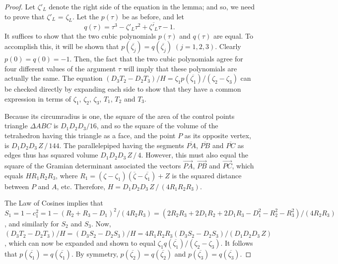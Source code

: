\documentclass[a4paper, twoside]{article}
\begin{document}
\vspace{2mm} 

\begin{proof}
Let $\zeta'_L$ denote the right side of the equation in the lemma; and so, we need to prove that $\zeta'_L$ = $\zeta_L$.
Let the $p(\tau)$ be as before, and let 
$$q(\tau) = \tau^3 - \zeta'_L \tau^2 + \overline{\zeta'_L} \tau - 1.$$ 
It suffices to show that the two cubic polynomials $p(\tau)$ and $q(\tau)$ are equal. To accomplish this, it will be shown that $p(\overline{\zeta_j}) = q(\overline{\zeta_j}) \; (j=1,2,3)$. Clearly $p(0) = q(0) = -1$. Then, the fact that the two cubic polynomials agree for four different values of the argument $\tau$ will imply that these polynomials are actually the same. The equation $(D_3 T_2 - D_2 T_3) / H = \zeta_1 p(\overline{\zeta_1}) / (\zeta_2-\zeta_3)$ can be checked directly by expanding each side to show that they have a common expression in terms of $\zeta_1$, $\zeta_2$, $\zeta_3$, $T_1$, $T_2$ and $T_3$. 

Because its circumradius is one, the square of the area of the control points triangle $\Delta ABC$ is $D_1 D_2 D_3 / 16$, and so the square of the volume of the tetrahedron having this triangle as a face, and the point $P$ as its opposite vertex, is $D_1 D_2 D_3 \, Z \, / \, 144$. The parallelepiped having the segments $\overline{PA}$, $\overline{PB}$ and $\overline{PC}$ as edges thus has squared volume $D_1 D_2 D_3 \, Z \,  / \, 4$. However, this must also equal the square of the Gramian determinant associated the vectors $\overrightarrow{PA}$, $\overrightarrow{PB}$ and $\overrightarrow{PC}$, which equals $H R_1 R_2 R_3$, where $R_1 = (\zeta - \zeta_1)(\overline{\zeta} - \overline{\zeta_1}) + Z$ is the squared distance between $P$ and $A$, etc. Therefore, $H = D_1 D_2 D_3 \, Z \, / \, (4 R_1 R_2 R_3)$. 

The Law of Cosines implies that $S_1 = 1 - c_1^2 = 1 - (R_2+R_3-D_1)^2 / (4 R_2 R_3) = (2 R_2 R_3 + 2 D_1 R_2 + 2 D_1 R_3 - D_1^2 - R_2^2 - R_3^2) / (4 R_2 R_3)$, and similarly for $S_2$ and $S_3$. Now, $(D_3 T_2 - D_2 T_3) / H =  (D_3 S_2 - D_2 S_3) / H =  4 R_1 R_2 R_3 (D_3 S_2 - D_2 S_3) / (D_1 D_2 D_3 \, Z)$, which can now be expanded and shown to equal $\zeta_1 q(\overline{\zeta_1}) / (\zeta_2-\zeta_3)$. It follows that $p(\overline{\zeta_1}) = q(\overline{\zeta_1})$. By symmetry, $p(\overline{\zeta_2}) = q(\overline{\zeta_2})$ and $p(\overline{\zeta_3}) = q(\overline{\zeta_3})$. 
\end{proof}

\vspace{2mm}
\end{document}
